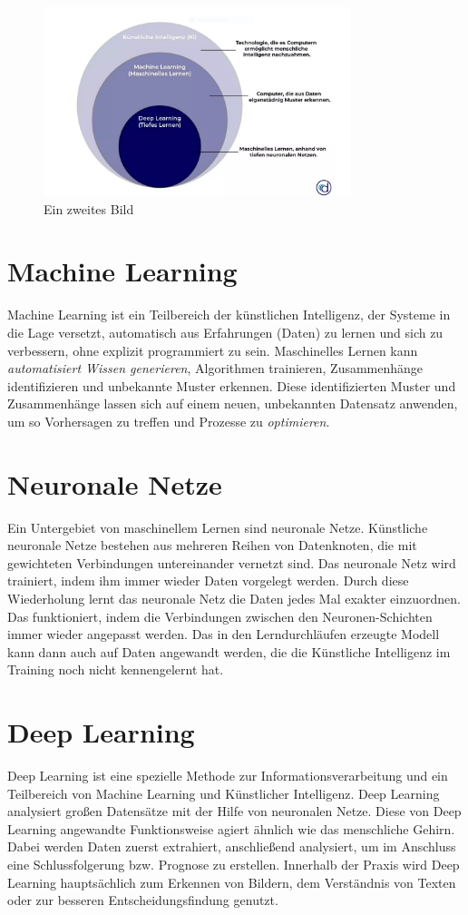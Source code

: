 \documentclass{report}
\begin{document}
  \begin{figure}[h]
    \centering 
    \includegraphics[width=0.8\textwidth]{ki-bestandtt.png} 
    \caption{Ein zweites Bild}
    \end{figure}

 \section{Machine Learning}
 Machine Learning ist ein Teilbereich der künstlichen Intelligenz, der Systeme in die Lage versetzt, automatisch 
 aus Erfahrungen (Daten) zu lernen und sich zu verbessern, ohne explizit programmiert zu sein.
 Maschinelles Lernen kann \textit{automatisiert Wissen generieren}, Algorithmen trainieren, Zusammenhänge identifizieren und unbekannte Muster erkennen. 
 Diese identifizierten Muster und Zusammenhänge lassen sich auf einem neuen, unbekannten Datensatz anwenden, 
 um so Vorhersagen zu treffen und Prozesse zu \textit{optimieren}.
 
 \section{Neuronale Netze}
 Ein Untergebiet von maschinellem Lernen sind neuronale Netze. Künstliche neuronale Netze bestehen aus mehreren Reihen von Datenknoten, 
 die mit gewichteten Verbindungen untereinander vernetzt sind.
 Das neuronale Netz wird trainiert, indem ihm immer wieder Daten vorgelegt werden. Durch diese Wiederholung lernt
 das neuronale Netz die Daten jedes Mal exakter einzuordnen. Das funktioniert, indem die Verbindungen
 zwischen den Neuronen-Schichten immer wieder angepasst werden. Das in den Lerndurchläufen 
 erzeugte Modell kann dann auch auf Daten angewandt werden, die die Künstliche Intelligenz im Training noch nicht kennengelernt hat.
 
 
 \section{Deep Learning} 
 Deep Learning ist eine spezielle Methode zur Informationsverarbeitung und ein Teilbereich von Machine Learning und Künstlicher 
 Intelligenz. Deep Learning analysiert großen Datensätze mit der Hilfe von neuronalen Netze. Diese von Deep Learning angewandte Funktionsweise
 agiert ähnlich wie das menschliche Gehirn. Dabei werden Daten zuerst extrahiert, anschließend analysiert, um im Anschluss eine 
 Schlussfolgerung bzw. Prognose zu erstellen. Innerhalb der Praxis wird Deep Learning hauptsächlich zum Erkennen von Bildern,
 dem Verständnis von Texten oder zur besseren Entscheidungsfindung genutzt. 
 
\end{document}
